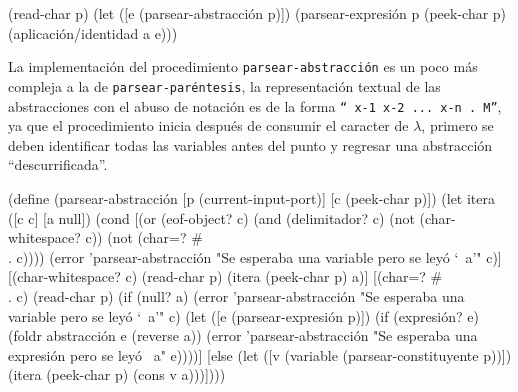 \nwenddocs{}\endmoddef
(read-char p)
(let ([e (parsear-abstracción p)])
  (parsear-expresión p (peek-char p) (aplicación/identidad a e)))
\nwendcode{}\nwdocspar

La implementación del procedimiento {\tt{}parsear-\protect{}abstracción\protect{}} es un poco más compleja a la de {\tt{}\protect{}parsear-paréntesis}, la representación textual de las abstracciones con el abuso de notación es de la forma {\tt{}``{}\ x-1\ x-2\ ...\ x-n\ .\ M''}, ya que el procedimiento inicia después de consumir el caracter de \( λ \), primero se deben identificar todas las variables antes del punto y regresar una abstracción ``descurrificada''.

\nwenddocs{}\plusendmoddef
(define (parsear-abstracción [p (current-input-port)]
                             [c (peek-char p)])
  (let itera ([c c]
              [a null])
    (cond [(or (eof-object? c)
               (and (delimitador? c) (not (char-whitespace? c)) (not (char=? #\\. c))))
           (error 'parsear-abstracción
                  "Se esperaba una variable pero se leyó `~a'" c)]
          [(char-whitespace? c)
           (read-char p)
           (itera (peek-char p) a)]
          [(char=? #\\. c)
           (read-char p)
           (if (null? a)
               (error 'parsear-abstracción
                      "Se esperaba una variable pero se leyó `~a'" c)
               (let ([e (parsear-expresión p)])
                 (if (expresión? e)
                     (foldr abstracción e (reverse a))
                     (error 'parsear-abstracción
                            "Se esperaba una expresión pero se leyó ~a" e))))]
          [else
           (let ([v (variable (parsear-constituyente p))])
             (itera (peek-char p) (cons v a)))])))

